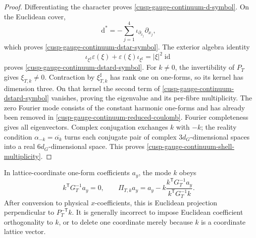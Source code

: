 \begin{proof}
Differentiating the character proves
\cref{cusp-gauge-continuum-d-symbol}.  On the Euclidean cover,
\[
 \mathrm d^*
 =-\sum_{j=1}^4
 \iota_{\partial_{x_j}}\partial_{x_j},
\]
which proves \cref{cusp-gauge-continuum-dstar-symbol}.  The exterior
algebra identity
\[
 \iota_{\xi^\sharp}\varepsilon(\xi)
 +\varepsilon(\xi)\iota_{\xi^\sharp}
 =\lvert\xi\rvert^2\operatorname{id}
\]
proves \cref{cusp-gauge-continuum-dstard-symbol}.
For \(k\ne0\), the invertibility of \(P_T\) gives \(\xi_{T,k}\ne0\).
Contraction by \(\xi_{T,k}^\sharp\) has rank one on one-forms, so its
kernel has dimension three.  On that kernel the second term of
\cref{cusp-gauge-continuum-dstard-symbol} vanishes, proving the eigenvalue
and its per-fibre multiplicity.  The zero Fourier mode consists of the
constant harmonic one-forms and has already been removed in
\cref{cusp-gauge-continuum-reduced-coulomb}.  Fourier completeness gives
all eigenvectors.  Complex conjugation exchanges \(k\) with \(-k\);
the reality condition \(\alpha_{-k}=\overline{\alpha_k}\) turns each
conjugate pair of complex \(3d_G\)-dimensional spaces into a real
\(6d_G\)-dimensional space.  This proves
\cref{cusp-gauge-continuum-shell-multiplicity}.
\end{proof}

\begin{remark}
\label{cusp-gauge-continuum-projection}
In lattice-coordinate one-form coefficients \(a_y\), the mode \(k\) obeys
\begin{equation}
 k^{\mathsf T}G_T^{-1}a_y=0,\qquad
 \Pi_{T,k}a_y
 =a_y-k\frac{k^{\mathsf T}G_T^{-1}a_y}
 {k^{\mathsf T}G_T^{-1}k}.
 \label{cusp-gauge-continuum-coordinate-projection}
\end{equation}
After conversion to physical \(x\)-coefficients, this is Euclidean
projection perpendicular to \(P_T^{-\mathsf T}k\).  It is generally
incorrect to impose Euclidean coefficient orthogonality to \(k\), or to
delete one coordinate merely because \(k\) is a coordinate lattice vector.
\end{remark}

